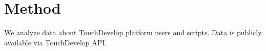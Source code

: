 \section{Method}

We analyze data about TouchDevelop platform users and scripts. Data is publicly available via TouchDevelop API.